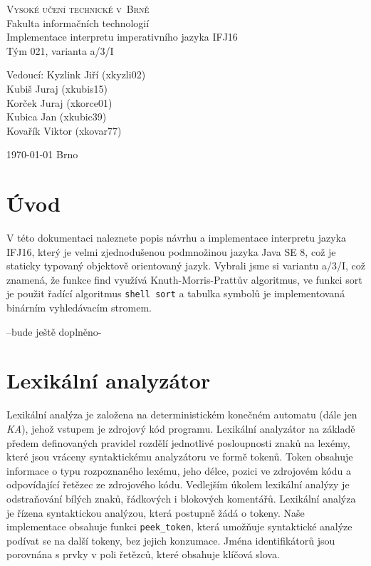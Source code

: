 \documentclass[a4paper,11pt]{article}
\begin{document}
\begin{center}
\Huge
\textsc{Vysoké učení technické v~Brně\\
}Fakulta informačních technologií\\
\LARGE Implementace interpretu imperativního jazyka IFJ16 \\
\Huge Tým 021, varianta a/3/I\\

\Large Vedoucí:	Kyzlink Jiří 	(xkyzli02)\\
				Kubiš Juraj		(xkubis15)\\
				Korček Juraj	(xkorce01)\\
				Kubica Jan		(xkubic39)\\
				Kovařík Viktor	(xkovar77)\\


\end{center}
{\Large \today \hfill
Brno}
\thispagestyle{empty}

\newpage

\tableofcontents

\newpage
\section{Úvod}
V této dokumentaci naleznete popis návrhu a implementace interpretu jazyka IFJ16, který je velmi zjednodušenou podmnožinou jazyka Java SE 8, což je staticky typovaný objektově orientovaný jazyk. Vybrali jsme si variantu  a/3/I, což znamená, že funkce find využívá Knuth-Morris-Prattův algoritmus, ve funkci sort je použit řadící algoritmus \texttt{shell sort} a tabulka symbolů je implementovaná binárním vyhledávacím stromem.

--bude ještě doplněno-

\section{Lexikální analyzátor}
Lexikální analýza je založena na deterministickém konečném automatu (dále jen \textit{KA}), jehož vstupem je zdrojový kód programu. Lexikální analyzátor na základě předem definovaných pravidel rozdělí jednotlivé posloupnosti znaků na lexémy, které jsou vráceny syntaktickému analyzátoru ve formě tokenů. Token obsahuje informace o typu rozpoznaného lexému, jeho délce, pozici ve zdrojovém kódu a odpovídající řetězec ze zdrojového kódu. Vedlejším úkolem lexikální analýzy je odstraňování bílých znaků, řádkových i blokových komentářů. Lexikální analýza je řízena syntaktickou analýzou, která postupně žádá o tokeny. Naše implementace obsahuje funkci \texttt{peek\_token}, která umožňuje syntaktické analýze podívat se na další tokeny, bez jejich konzumace. Jména identifikátorů jsou porovnána s prvky v poli řetězců, které obsahuje klíčová slova.
\end{document}
